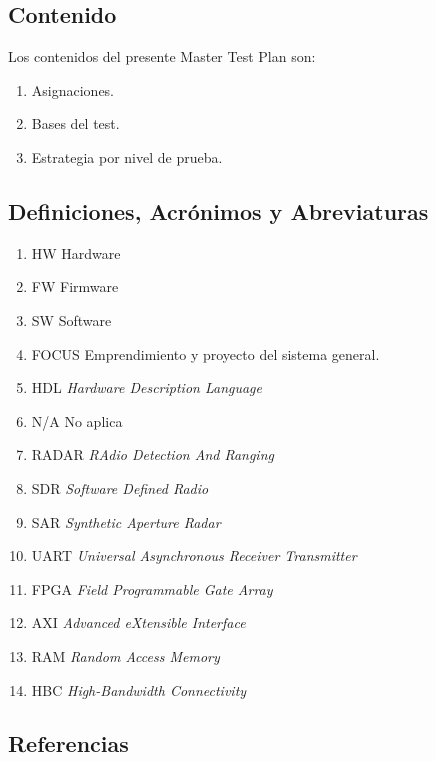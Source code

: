\documentclass[
11pt, %
]{charter}
\begin{document}
\subsection{Contenido}
\label{sec:org434c3ef}

Los contenidos del presente Master Test Plan son:
\begin{enumerate}
	 \item Asignaciones.
	 \item Bases del test.
	 \item Estrategia por nivel de prueba.
\end{enumerate}


\subsection{Definiciones, Acrónimos y Abreviaturas}
\label{sec:orgb158e36}

\begin{enumerate}
\item HW	Hardware
\item FW	Firmware
\item SW 	Software
\item FOCUS Emprendimiento y proyecto del sistema general.
\item HDL 	\textit{Hardware Description Language} 
\item N/A 	No aplica 
\item RADAR	\textit{RAdio Detection And Ranging}
\item SDR 	\textit{Software Defined Radio}
\item SAR	\textit{Synthetic Aperture Radar}
\item UART 	\textit{Universal Asynchronous Receiver Transmitter} 
\item FPGA 	\textit{Field Programmable Gate Array} 
\item AXI 	\textit{Advanced eXtensible Interface} 
\item RAM 	\textit{Random Access Memory}
\item HBC	\textit{High-Bandwidth Connectivity}
\end{enumerate}




\subsection{Referencias}
\label{sec:org62711e0}
\end{document}
